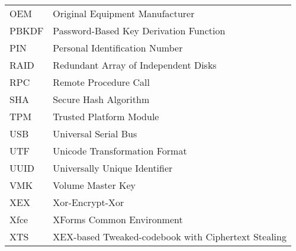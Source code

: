 \begin{longtable}{ll}
  OEM & Original Equipment Manufacturer \\
  PBKDF & Password-Based Key Derivation Function \\
  PIN & Personal Identification Number \\
  RAID & Redundant Array of Independent Disks \\
  RPC & Remote Procedure Call \\
  SHA & Secure Hash Algorithm \\
  TPM & Trusted Platform Module \\
  USB & Universal Serial Bus \\
  UTF & Unicode Transformation Format \\
  UUID & Universally Unique Identifier \\
  VMK & Volume Master Key \\
  XEX & Xor-Encrypt-Xor \\
  Xfce & XForms Common Environment \\
  XTS & XEX-based Tweaked-codebook with Ciphertext Stealing \\
\end{longtable}

